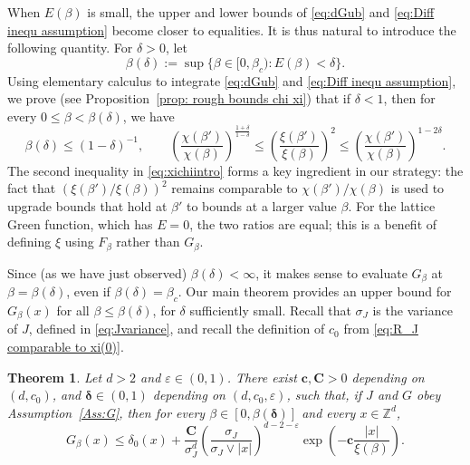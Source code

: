 \documentclass[11pt,a4paper]{article}
\numberwithin{equation}{section}
\theoremstyle{plain}
\newtheorem{Thm}{Theorem}[section]
\theoremstyle{definition}
\newcommand\1{\mathds{1}}
\newcommand\bfc{\mathbf{c}}
\newcommand\bfC{\mathbf{C}}
\newcommand{\deltamain}{\boldsymbol{\delta}}
\begin{document}
When $E(\beta)$ is small, the upper and lower bounds of
\eqref{eq:dGub} and \eqref{eq:Diff inequ assumption} become closer to equalities.
It is thus natural to introduce the following quantity. For $\delta>0$, let
\begin{equation}
\label{eq:Edef}
    \beta(\delta)
    :=\sup\big\{\beta\in [0, \beta_c ) :E (\beta)<\delta\big\}.
\end{equation}
Using elementary calculus
to integrate \eqref{eq:dGub} and \eqref{eq:Diff inequ assumption}, we prove (see Proposition~\ref{prop: rough bounds chi xi}) that if $\delta <1$, then
for every $0\leq  \beta < \beta(\delta)$, we have
\begin{equation}
\label{eq:xichiintro}
	\beta(\delta) \le (1-\delta)^{-1}, \qquad \left(\frac{\chi(\beta')}{\chi(\beta)}\right)^{\frac{1+\delta}{1-\delta}}
    \leq \left(\frac{\xi(\beta')}{\xi(\beta)}\right)^2
    \leq \left(\frac{\chi(\beta')}{\chi(\beta)}\right)^{ 1-2\delta}.
\end{equation}
The second inequality in \eqref{eq:xichiintro} forms a key ingredient in our strategy: the fact that $(\xi(\beta')/\xi(\beta))^2$ remains comparable to $\chi(\beta')/\chi(\beta)$ is used to upgrade bounds that hold at $\beta'$ to bounds at a larger value $\beta$.  For the lattice Green function,
which has $E=0$, the two ratios are equal; this is a benefit of defining $\xi$ using
$F_\beta$ rather than $G_\beta$.

Since (as we have just observed) $\beta(\delta)<\infty$, it makes sense to evaluate $G_\beta$ at $\beta=\beta(\delta)$,
even if $\beta(\delta) =\beta_c$.
Our main theorem provides an upper bound for $G_\beta(x)$
for all $\beta\le \beta(\delta)$, for $\delta$ sufficiently small.
Recall that $\sigma_J$ is the variance of
$J$, defined in \eqref{eq:Jvariance}, and recall the definition of $c_0$ from \eqref{eq:R_J comparable to xi(0)}.


\begin{Thm}
\label{thm:maintheorem}
	Let $d>2$ and $\varepsilon\in(0,1)$. There exist $\bfc,\bfC>0$ depending on $(d,c_0)$,
and $\deltamain\in(0,1)$ depending on $(d,c_0,\varepsilon)$, such that, if $J$ and $G$ obey Assumption~\textup{\ref{Ass:G}}, then for every $\beta\in [0, \beta(\deltamain)]$ and every $x\in\mathbb Z^d$,
\begin{equation}
\label{eq: target estimate below beta(delta)}
	G_\beta(x)\leq \delta_0(x)
    + \frac{ \bfC}{\sigma_J^d}
    \left(\frac{\sigma_J}{\sigma_J \vee|x|} \right)^{d-2-\varepsilon}
    \exp\left(-\bfc\frac{|x|}{\xi(\beta)}\right).
\end{equation}
\end{Thm}
\end{document}
